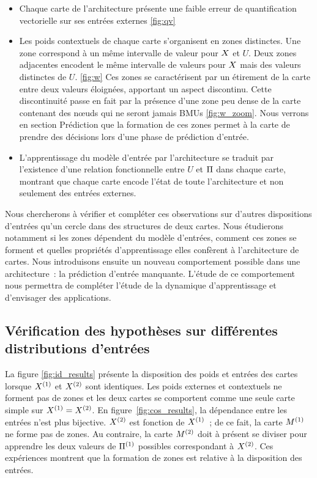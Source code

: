 \documentclass[../main]{subfiles}
\begin{document}
\begin{itemize}
	\item Chaque carte de l'architecture présente une faible erreur de quantification vectorielle sur ses entrées externes \ref{fig:qv}
	\item Les poids contextuels de chaque carte s'organisent en zones distinctes. Une zone correspond à un même intervalle de valeur pour $X$ et $U$. Deux zones adjacentes encodent le même intervalle de valeurs pour $X$ mais des valeurs distinctes de $U$. \ref{fig:w} Ces zones se caractérisent par un étirement de la carte entre deux valeurs éloignées, apportant un aspect discontinu. Cette discontinuité passe en fait par la présence d'une zone peu dense de la carte contenant des n\oe{}uds qui ne seront jamais BMUs \ref{fig:w_zoom}. Nous verrons en section Prédiction que la formation de ces zones permet à la carte de prendre des décisions lors d'une phase de prédiction d'entrée.
	\item L'apprentissage du modèle d'entrée par l'architecture se traduit par l'existence d'une relation fonctionnelle entre $U$ et $\Pi$ dans chaque carte, montrant que chaque carte encode l'état de toute l'architecture et non seulement des entrées externes.
\end{itemize}

Nous chercherons à vérifier et compléter ces observations sur d'autres dispositions d'entrées qu'un cercle dans des structures de deux cartes. Nous étudierons notamment si les zones dépendent du modèle d'entrées, comment ces zones se forment et quelles propriétés d'apprentissage elles confèrent à l'architecture de cartes.
Nous introduisons ensuite un nouveau comportement possible dans une architecture~: la prédiction d'entrée manquante. L'étude de ce comportement nous permettra de compléter l'étude de la dynamique d'apprentissage et d'envisager des applications.


\subsection{Vérification des hypothèses sur différentes distributions d'entrées}

La figure \ref{fig:id_results} présente la disposition des poids et entrées des cartes lorsque $X^{({1})}$ et $X^{({2})}$ sont identiques. 
Les poids externes et contextuels ne forment pas de zones et les deux cartes se comportent comme une seule carte simple sur $X^{({1})} = X^{({2})}$.
En figure~\ref{fig:cos_results}, la dépendance entre les entrées n'est plus bijective. $X^{({2})}$ est fonction de $X^{({1})}$~; de ce fait, la carte $M^{({1})}$ ne forme pas de zones. Au contraire, la carte $M^{({2})}$ doit à présent se diviser pour apprendre les deux valeurs de $\Pi^{({1})}$ possibles correspondant à $X^{({2})}$. Ces expériences montrent que la formation de zones est relative à la disposition des entrées.
\end{document}
